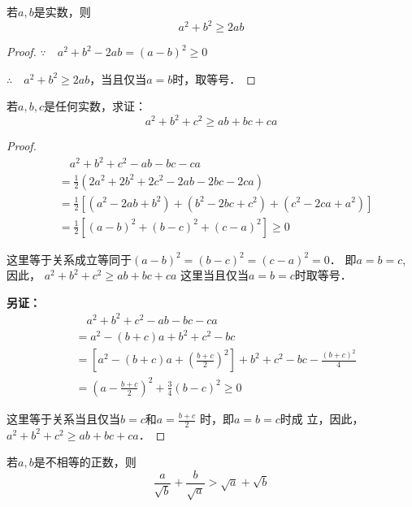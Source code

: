\begin{example}
    若$a,b$是实数，则
    \begin{equation}
        a^2+b^2\ge 2ab
    \end{equation}
\end{example}
\begin{proof}
    $\because\quad a^2+b^2-2ab=(a-b)^2\ge 0$

    $\therefore\quad a^2+b^2\ge 2ab$，当且仅当$a=b$时，取等号．
\end{proof}

    
\begin{example}
    若$a,b,c$是任何实数，求证：
    \begin{equation}
   a^2+b^2+c^2\ge ab+bc+ca     
    \end{equation}
\end{example}

\begin{proof}
    \[\begin{split}
     &\quad   a^2+b^2+c^2-ab-bc-ca \\
      &=\frac{1}{2}( 2a^2+2b^2+2c^2-2ab-2bc-2ca)\\
        &=\frac{1}{2}\left[(a^2-2ab+b^2)+(b^2-2bc+c^2)+(c^2-2ca+a^2)\right]\\
        &=\frac{1}{2}\left[(a-b)^2+(b-c)^2+(c-a)^2\right]\ge 0
    \end{split}\]
   
    这里等于关系成立等同于$(a-b)^2=(b-c)^2=(c-a)^2=0$．
    即$a=b=c$, 因此，
$a^2+b^2+c^2\ge ab+bc+ca $
这里当且仅当$a=b=c$时取等号．

\textbf{另证：} 
\[\begin{split}
    &\quad   a^2+b^2+c^2-ab-bc-ca \\
&=a^2-(b+c)a+b^2+c^2-bc\\
&=\left[a^2-(b+c)a+\left(\frac{b+c}{2}\right)^2\right]+b^2+c^2-bc-\frac{(b+c)^2}{4}\\
&=\left(a-\frac{b+c}{2}\right)^2+\frac{3}{4}(b-c)^2\ge 0
\end{split}\]

这里等于关系当且仅当$b=c$和$a=\frac{b+c}{2}$
时，即$a=b=c$时成
立，因此，
$a^2+b^2+c^2\ge ab+bc+ca $．
\end{proof}




\begin{example}
    若$a,b$是不相等的正数，则
\[\frac{a}{\sqrt{b}}+\frac{b}{\sqrt{a}}>\sqrt{a}+\sqrt{b}\]
\end{example}
    

